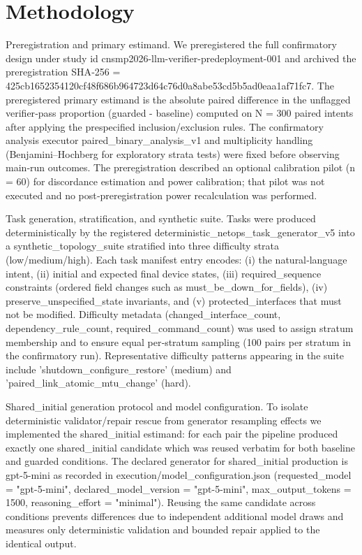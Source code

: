 \documentclass[conference]{IEEEtran}
\begin{document}
\section{Methodology}
Preregistration and primary estimand. We preregistered the full confirmatory design under study id cnsmp2026-llm-verifier-predeployment-001 and archived the preregistration SHA‑256 = 425cb165\allowbreak{}2354120c\allowbreak{}f48f686b\allowbreak{}964723d6\allowbreak{}4c76d0a8\allowbreak{}abe53cd5\allowbreak{}b5ad0eaa\allowbreak{}1af71fc7. The preregistered primary estimand is the absolute paired difference in the unflagged verifier‑pass proportion (guarded - baseline) computed on N = 300 paired intents after applying the prespecified inclusion/exclusion rules. The confirmatory analysis executor paired\_binary\_analysis\_v1 and multiplicity handling (Benjamini--Hochberg for exploratory strata tests) were fixed before observing main‑run outcomes. The preregistration described an optional calibration pilot (n = 60) for discordance estimation and power calibration; that pilot was not executed and no post‑preregistration power recalculation was performed.

Task generation, stratification, and synthetic suite. Tasks were produced deterministically by the registered deterministic\_netops\_task\_generator\_v5 into a synthetic\_topology\_suite stratified into three difficulty strata (low/medium/high). Each task manifest entry encodes: (i) the natural‑language intent, (ii) initial and expected final device states, (iii) required\_sequence constraints (ordered field changes such as must\_be\_down\_for\_fields), (iv) preserve\_unspecified\_state invariants, and (v) protected\_interfaces that must not be modified. Difficulty metadata (changed\_interface\_count, dependency\_rule\_count, required\_command\_count) was used to assign stratum membership and to ensure equal per‑stratum sampling (100 pairs per stratum in the confirmatory run). Representative difficulty patterns appearing in the suite include 'shutdown\_configure\_restore' (medium) and 'paired\_link\_atomic\_mtu\_change' (hard).

Shared\_initial generation protocol and model configuration. To isolate deterministic validator/repair rescue from generator resampling effects we implemented the shared\_initial estimand: for each pair the pipeline produced exactly one shared\_initial candidate which was reused verbatim for both baseline and guarded conditions. The declared generator for shared\_initial production is gpt-5-mini as recorded in execution/model\_configuration.json (requested\_model = "gpt-5-mini", declared\_model\_version = "gpt-5-mini", max\_output\_tokens = 1500, reasoning\_effort = "minimal"). Reusing the same candidate across conditions prevents differences due to independent additional model draws and measures only deterministic validation and bounded repair applied to the identical output.
\end{document}
